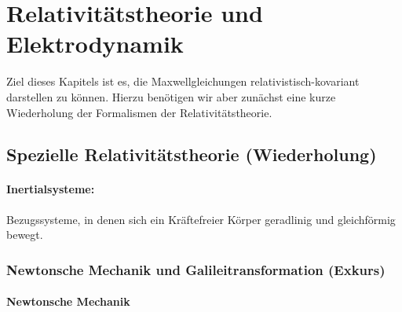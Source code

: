 \chapter{Relativitätstheorie und Elektrodynamik}

Ziel dieses Kapitels ist es, die Maxwellgleichungen relativistisch-kovariant darstellen zu können. Hierzu benötigen wir aber zunächst eine kurze Wiederholung der Formalismen der Relativitätstheorie.

\section{Spezielle Relativitätstheorie (Wiederholung)}

\subsubsection{Inertialsysteme:}

Bezugssysteme, in denen sich ein Kräftefreier Körper geradlinig und gleichförmig bewegt.

\subsection{Newtonsche Mechanik und Galileitransformation (Exkurs)}

\subsubsection{Newtonsche Mechanik}

